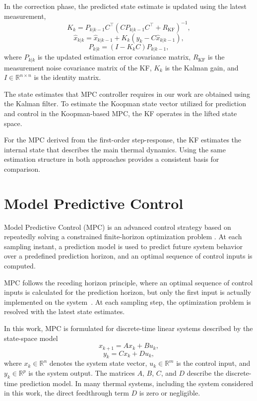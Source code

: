 In the correction phase, the predicted state estimate is updated using the latest measurement,
\begin{equation}
K_k = P_{k|k-1} C^\top \left( C P_{k|k-1} C^\top + R_{\mathrm{KF}} \right)^{-1},
\end{equation}
\begin{equation}
\hat{x}_{k|k} = \hat{x}_{k|k-1} + K_k \left( y_k - C \hat{x}_{k|k-1} \right),
\end{equation}
\begin{equation}
P_{k|k} = (I - K_k C) P_{k|k-1},
\end{equation}
where $P_{k|k}$ is the updated estimation error covariance matrix, $R_{\mathrm{KF}}$ is the measurement noise covariance matrix of the KF, $K_k$ is the Kalman gain, and $I \in \mathbb{R}^{n \times n}$ is the identity matrix.

The state estimates that MPC controller requires in our work are obtained using the Kalman filter. To estimate the Koopman state vector utilized for prediction and control in the Koopman-based MPC, the KF operates in the lifted state space.

For the MPC derived from the first-order step-response, the KF estimates the internal state that describes the main thermal dynamics. Using the same estimation structure in both approaches provides a consistent basis for comparison.


\section{Model Predictive Control}
\label{sec:MPC}

Model Predictive Control (MPC) is an advanced control strategy based on repeatedly solving a constrained finite-horizon optimization problem \cite{rawlings_mpc,martin2019mpc}. At each sampling instant, a prediction model is used to predict future system behavior over a predefined prediction horizon, and an optimal sequence of control inputs is computed.

MPC follows the receding horizon principle, where an optimal sequence of control inputs is calculated for the prediction horizon, but only the first input is actually implemented on the system \cite{martin2019mpc}. At each sampling step, the optimization problem is resolved with the latest state estimates.

In this work, MPC is formulated for discrete-time linear systems described by the state-space model
\begin{equation}
x_{k+1} = A x_k + B u_k,
\end{equation}
\begin{equation}
y_k = C x_k + D u_k,
\end{equation}
where $x_k \in \mathbb{R}^n$ denotes the system state vector, $u_k \in \mathbb{R}^m$ is the control input, and $y_k \in \mathbb{R}^p$ is the system output. The matrices $A$, $B$, $C$, and $D$ describe the discrete-time prediction model. In many thermal systems, including the system considered in this work, the direct feedthrough term $D$ is zero or negligible.

